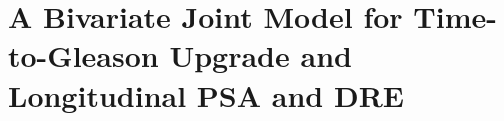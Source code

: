 \section{A Bivariate Joint Model for Time-to-Gleason Upgrade and Longitudinal PSA and DRE}
\label{sec:jointmodel}


